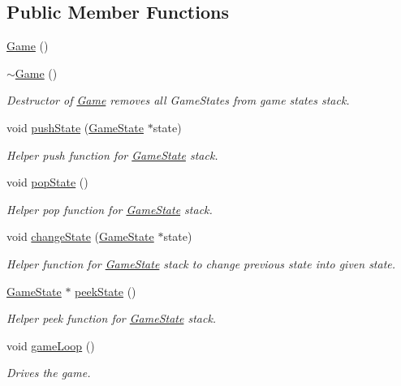 \subsection*{Public Member Functions}
\begin{DoxyCompactItemize}
\item 
\hyperlink{class_game_ad59df6562a58a614fda24622d3715b65}{Game} ()
\item 
\hyperlink{class_game_ae3d112ca6e0e55150d2fdbc704474530}{$\sim$\+Game} ()
\begin{DoxyCompactList}\small\item\em Destructor of \hyperlink{class_game}{Game} removes all Game\+States from game states stack. \end{DoxyCompactList}\item 
void \hyperlink{class_game_a5898f1edb6e3bc1700b2ffb1943bc609}{push\+State} (\hyperlink{class_game_state}{Game\+State} $\ast$state)
\begin{DoxyCompactList}\small\item\em Helper push function for \hyperlink{class_game_state}{Game\+State} stack. \end{DoxyCompactList}\item 
void \hyperlink{class_game_a4b33dd67adef59bebadba8a234282c88}{pop\+State} ()
\begin{DoxyCompactList}\small\item\em Helper pop function for \hyperlink{class_game_state}{Game\+State} stack. \end{DoxyCompactList}\item 
void \hyperlink{class_game_a8683b16995200bd11d95efc372e6722a}{change\+State} (\hyperlink{class_game_state}{Game\+State} $\ast$state)
\begin{DoxyCompactList}\small\item\em Helper function for \hyperlink{class_game_state}{Game\+State} stack to change previous state into given state. \end{DoxyCompactList}\item 
\hyperlink{class_game_state}{Game\+State} $\ast$ \hyperlink{class_game_a6cdc6cb374ab8e7d8ac9b280284b3793}{peek\+State} ()
\begin{DoxyCompactList}\small\item\em Helper peek function for \hyperlink{class_game_state}{Game\+State} stack. \end{DoxyCompactList}\item 
void \hyperlink{class_game_aede5f46c8c7bbbaf8459eeec397a11e7}{game\+Loop} ()
\begin{DoxyCompactList}\small\item\em Drives the game. \end{DoxyCompactList}\end{DoxyCompactItemize}
